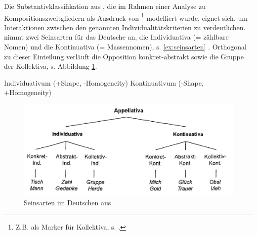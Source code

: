 Die Substantivklassifikation aus \textcite[104]{Zifonun2012}, die im Rahmen einer Analyse zu Kompositionszweitgliedern als Ausdruck von \footnote{Z.B. als Marker für Kollektiva, s. \textcite[101]{Zifonun2012}.} modelliert wurde, eignet sich, um  Interaktionen zwischen den genannten Individualitätskriterien zu verdeutlichen. \textcite[103]{Zifonun2012} nimmt zwei Seinsarten für das Deutsche an, die Individuativa (= zählbare Nomen) und die Kontinuativa (= Massennomen), s. \ref{ex:seinsarten} \parencite[basierend auf][]{Rijkhoff1991,Rijkhoff2002}. Orthogonal zu dieser Einteilung verläuft die Opposition konkret-abstrakt sowie die Gruppe der Kollektiva, s. Abbildung \ref{abb:zifonun-seinsarten}.

\begin{exe}
	\ex \label{ex:seinsarten}
	\begin{xlist}
		\ex \label{ex:indi} Individuativum (+Shape, -Homogeneity)
		\ex \label{ex:konti} Kontinuativum (-Shape, +Homogeneity)
 	\end{xlist}
\end{exe}

\begin{figure}
\begin{center}
\includegraphics[width=12cm]{images/zifonun-seinarten-neu.jpg}
\caption {Seinsarten im Deutschen aus \textcite[104]{Zifonun2012}\label{abb:zifonun-seinsarten}}
\end{center}
\end{figure}

